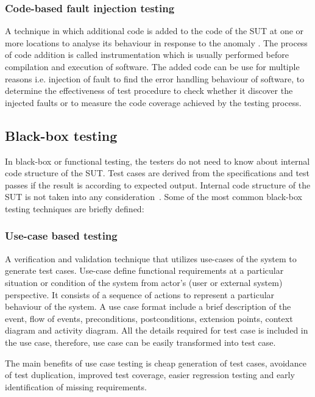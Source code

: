 \subsubsection{Code-based fault injection testing}
A technique in which additional code is added to the code of the SUT at one or more locations to analyse its behaviour in response to the anomaly \cite{voas1997software}. The process of code addition is called instrumentation which is usually performed before compilation and execution of software. The added code can be use for multiple reasons i.e. injection of fault to find the error handling behaviour of software, to determine the effectiveness of test procedure to check whether it discover the injected faults or to measure the code coverage achieved by the testing process.    

\subsection{Black-box testing}
In black-box or functional testing, the testers do not need to know about internal code structure of the SUT. Test cases are derived from the specifications and test passes if the result is according to expected output. Internal code structure of the SUT is not taken into any consideration~\cite{beizer1995black}. Some of the most common black-box testing techniques are briefly defined:

\subsubsection{Use-case based testing}
A verification and validation technique that utilizes use-cases of the system to generate test cases. Use-case define functional requirements at a particular situation or condition of the system from actor's (user or external system) perspective. It consists of a sequence of actions to represent a particular behaviour of the system. A use case format include a brief description of the event, flow of events, preconditions, postconditions, extension points, context diagram and activity diagram. All the details required for test case is included in the use case, therefore, use case can be easily transformed into test case. 


\noindent The main benefits of use case testing is cheap generation of test cases, avoidance of test duplication, improved test coverage, easier regression testing and early identification of missing requirements.  

